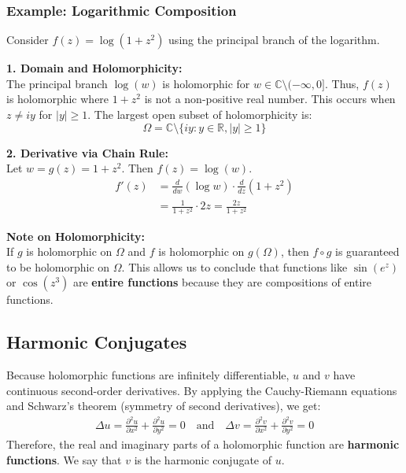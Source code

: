 \documentclass[a4paper,11pt]{article}
\begin{document}
\subsubsection{Example: Logarithmic Composition}
Consider $f(z) = \log(1+z^2)$ using the principal branch of the logarithm.

\textbf{1. Domain and Holomorphicity:} \\
The principal branch $\log(w)$ is holomorphic for $w \in \mathbb{C} \setminus (-\infty, 0]$. Thus, $f(z)$ is holomorphic where $1+z^2$ is not a non-positive real number. This occurs when $z \neq iy$ for $|y| \geq 1$. The largest open subset of holomorphicity is:
\begin{equation*}
    \Omega = \mathbb{C} \setminus \{iy : y \in \mathbb{R}, |y| \geq 1\}
\end{equation*}

\textbf{2. Derivative via Chain Rule:} \\
Let $w = g(z) = 1+z^2$. Then $f(z) = \log(w)$.
\begin{align*}
    f'(z) &= \frac{d}{dw}(\log w) \cdot \frac{d}{dz}(1+z^2) \\
    &= \frac{1}{1+z^2} \cdot 2z = \frac{2z}{1+z^2}
\end{align*}

\textbf{Note on Holomorphicity:} \\
If $g$ is holomorphic on $\Omega$ and $f$ is holomorphic on $g(\Omega)$, then $f \circ g$ is guaranteed to be holomorphic on $\Omega$. This allows us to conclude that functions like $\sin(e^z)$ or $\cos(z^3)$ are \textbf{entire functions} because they are compositions of entire functions.
\subsection{Harmonic Conjugates}
Because holomorphic functions are infinitely differentiable, $u$ and $v$ have continuous second-order derivatives. By applying the Cauchy-Riemann equations and Schwarz's theorem (symmetry of second derivatives), we get:
\begin{align*}
    \Delta u = \frac{\partial^2 u}{\partial x^2} + \frac{\partial^2 u}{\partial y^2} = 0 \quad \text{and} \quad \Delta v = \frac{\partial^2 v}{\partial x^2} + \frac{\partial^2 v}{\partial y^2} = 0
\end{align*}
Therefore, the real and imaginary parts of a holomorphic function are \textbf{harmonic functions}. We say that $v$ is the harmonic conjugate of $u$.
\end{document}
